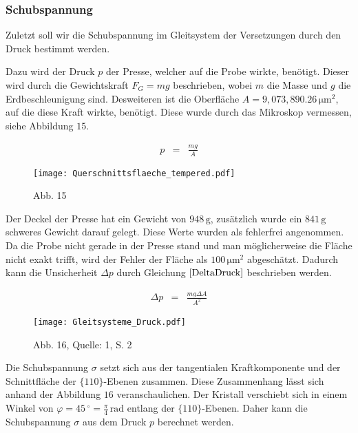 \documentclass[12pt,a4paper]{scrartcl}
\numberwithin{equation}{section} %
\renewcommand{\[}{} %
\renewcommand{\]}{\noindent} %
\begin{document}
\hypertarget{schubspannung}{%
\subsubsection{Schubspannung}\label{schubspannung}}

Zuletzt soll wir die Schubspannung im Gleitsystem der Versetzungen durch
den Druck bestimmt werden.

Dazu wird der Druck \(p\) der Presse, welcher auf die Probe wirkte,
benötigt. Dieser wird durch die Gewichtskraft \(F_G=mg\) beschrieben,
wobei \(m\) die Masse und \(g\) die Erdbeschleunigung sind. Desweiteren
ist die Oberfläche \(A=9,073,890.26\mathrm{\,\mu m^2}\), auf die diese
Kraft wirkte, benötigt. Diese wurde durch das Mikroskop vermessen, siehe
Abbildung \(15\).

\[
\begin{eqnarray}
    p &=& \frac{mg}{A} \label{Druck}
\end{eqnarray}
\]

\begin{figure}
\centering
\texttt{[image: Querschnittsflaeche\_tempered.pdf]}
\caption{Abb. 15}
\end{figure}

Der Deckel der Presse hat ein Gewicht von \(948\mathrm{\,g}\),
zusätzlich wurde ein \(841\mathrm{\,g}\) schweres Gewicht darauf gelegt.
Diese Werte wurden als fehlerfrei angenommen. Da die Probe nicht gerade
in der Presse stand und man möglicherweise die Fläche nicht exakt
trifft, wird der Fehler der Fläche als \(100\mathrm{\,\mu m^2}\)
abgeschätzt. Dadurch kann die Unsicherheit \(\Delta p\) durch Gleichung
\(\eqref{DeltaDruck}\) beschrieben werden.

\[
\begin{eqnarray}
    \Delta p &=& \frac{mg \Delta A}{A^2} \label{DeltaDruck}
\end{eqnarray}
\]

\begin{figure}
\centering
\texttt{[image: Gleitsysteme\_Druck.pdf]}
\caption{Abb. 16, Quelle: 1, S. 2}
\end{figure}

Die Schubspannung \(\sigma\) setzt sich aus der tangentialen
Kraftkomponente und der Schnittfläche der \(\lbrace110\rbrace\)-Ebenen
zusammen. Diese Zusammenhang lässt sich anhand der Abbildung \(16\)
veranschaulichen. Der Kristall verschiebt sich in einem Winkel von
\(\varphi=45\,^\circ=\frac{\pi}{4}\mathrm{\,rad}\) entlang der
\(\lbrace110\rbrace\)-Ebenen. Daher kann die Schubspannung \(\sigma\)
aus dem Druck \(p\) berechnet werden.
\end{document}
